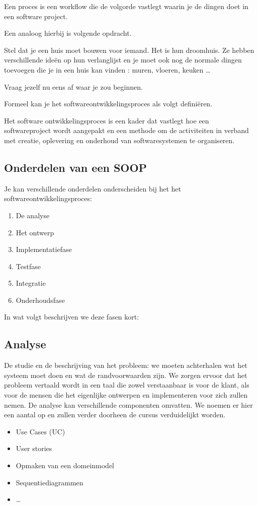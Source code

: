 Een proces is een workflow die de volgorde vastlegt waarin je de dingen doet in een software project. 

Een analoog hierbij is volgende opdracht.

\begin{exercise}
Stel dat je een huis moet bouwen voor iemand. Het is hun droomhuis.  Ze hebben verschillende ide\"en op hun verlanglijst en je moet ook nog de normale dingen toevoegen die je in een huis kan vinden : muren, vloeren, keuken \dots

Vraag jezelf nu eens af waar je zou beginnen.
\end{exercise}

Formeel kan je het softwareontwikkelingsproces als volgt defini\"eren.
\begin{definition}
	Het software ontwikkelingsproces is  een kader dat vastlegt hoe een softwareproject wordt aangepakt en 
een methode om de activiteiten in verband met creatie, oplevering en onderhoud van softwaresystemen te organiseren.
\end{definition}

\subsection{Onderdelen van een SOOP}
Je kan verschillende onderdelen onderscheiden bij het het softwareontwikkelingsproces:
\begin{enumerate}
	\item De analyse
	\item Het ontwerp
	\item Implementatiefase
	\item Testfase
	\item Integratie
	\item Onderhoudsfase
\end{enumerate}

In wat volgt beschrijven we deze fasen kort:

\subsection{Analyse}
De studie en de beschrijving van het probleem: we moeten achterhalen wat het systeem moet doen en wat de randvoorwaarden zijn. We zorgen ervoor dat het probleem vertaald wordt in een taal die zowel verstaanbaar is voor de klant, als voor de mensen die het eigenlijke ontwerpen en implementeren voor zich zullen nemen. De analyse kan  verschillende componenten omvatten. We noemen er hier een aantal op en zullen verder doorheen de cursus verduidelijkt worden.
\begin{itemize}
	\item Use Cases (UC)
	\item User stories
	\item Opmaken van een domeinmodel
	\item Sequentiediagrammen
	\item \dots
\end{itemize}

